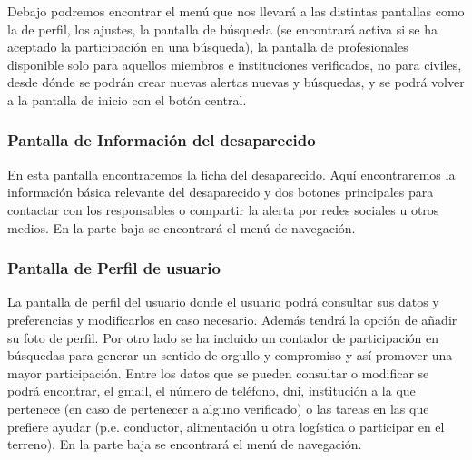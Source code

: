     Debajo podremos encontrar el menú que nos llevará a las distintas pantallas como la de perfil, los ajustes, la pantalla de búsqueda (se encontrará activa si se ha aceptado la participación en una búsqueda), la pantalla de profesionales disponible solo para aquellos miembros e instituciones verificados, no para civiles, desde dónde se podrán crear nuevas alertas nuevas y búsquedas, y se podrá volver a la pantalla de inicio con el botón central.


    \vspace{6cm}
    
    \subsubsection{Pantalla de Información del desaparecido}
    En esta pantalla encontraremos la ficha del desaparecido. Aquí encontraremos la información básica relevante del desaparecido y dos botones principales para contactar con los responsables o compartir la alerta por redes sociales u otros medios. En la parte baja se encontrará el menú de navegación.


    \vspace{15cm}

    \subsubsection{Pantalla de Perfil de usuario}
    La pantalla de perfil del usuario donde el usuario podrá consultar sus datos y preferencias y modificarlos en caso necesario. Además tendrá la opción de añadir su foto de perfil. Por otro lado se ha incluido un contador de participación en búsquedas para generar un sentido de orgullo y compromiso y así promover una mayor participación. Entre los datos que se pueden consultar o modificar se podrá encontrar, el gmail, el número de teléfono, dni, institución a la que pertenece (en caso de pertenecer a alguno verificado) o las tareas en las que prefiere ayudar (p.e. conductor, alimentación u otra logística o participar en el terreno). En la parte baja se encontrará el menú de navegación.
    

